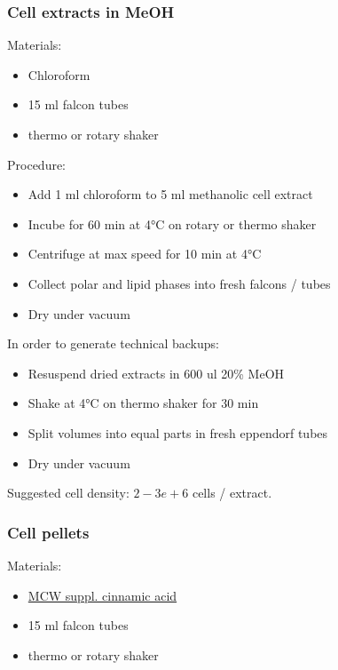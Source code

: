 \documentclass[]{book}
\providecommand{\tightlist}{%
  \setlength{\itemsep}{0pt}\setlength{\parskip}{0pt}}
\theoremstyle{definition}
\theoremstyle{definition}
\theoremstyle{definition}
\theoremstyle{remark}
\begin{document}
\hypertarget{ccextraction_meoh}{\subsubsection{Cell extracts in
MeOH}\label{ccextraction_meoh}}

Materials:

\begin{itemize}
\tightlist
\item
  Chloroform
\item
  15 ml falcon tubes
\item
  thermo or rotary shaker
\end{itemize}

Procedure:

\begin{itemize}
\tightlist
\item
  Add 1 ml chloroform to 5 ml methanolic cell extract
\item
  Incube for 60 min at 4°C on rotary or thermo shaker
\item
  Centrifuge at max speed for 10 min at 4°C
\item
  Collect polar and lipid phases into fresh falcons / tubes
\item
  Dry under vacuum
\end{itemize}

In order to generate technical backups:

\begin{itemize}
\tightlist
\item
  Resuspend dried extracts in 600 ul 20\% MeOH
\item
  Shake at 4°C on thermo shaker for 30 min
\item
  Split volumes into equal parts in fresh eppendorf tubes
\item
  Dry under vacuum
\end{itemize}

Suggested cell density: \(2-3e+6\) cells / extract.

\hypertarget{ccextraction_susp}{\subsubsection{Cell
pellets}\label{ccextraction_susp}}

Materials:

\begin{itemize}
\tightlist
\item
  \protect\hyperlink{mcw}{MCW suppl. cinnamic acid}
\item
  15 ml falcon tubes
\item
  thermo or rotary shaker
\end{itemize}
\end{document}
